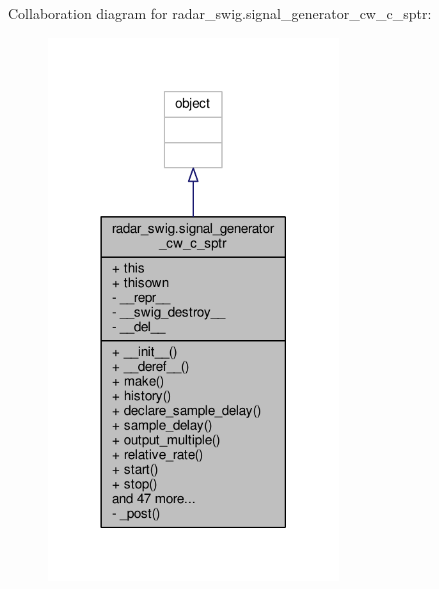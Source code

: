 Collaboration diagram for radar\+\_\+swig.\+signal\+\_\+generator\+\_\+cw\+\_\+c\+\_\+sptr\+:
\nopagebreak
\begin{figure}[H]
\begin{center}
\leavevmode
\includegraphics[width=218pt]{d1/dd8/classradar__swig_1_1signal__generator__cw__c__sptr__coll__graph}
\end{center}
\end{figure}
